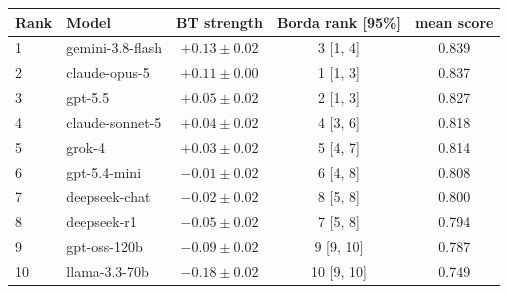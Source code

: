 \begin{tabular}{llccc}
\toprule
Rank & Model & BT strength & Borda rank [95\%] & mean score \\
\midrule
1 & gemini-3.8-flash & $+0.13 \pm 0.02$ & 3 [1, 4] & 0.839 \\
2 & claude-opus-5 & $+0.11 \pm 0.00$ & 1 [1, 3] & 0.837 \\
3 & gpt-5.5 & $+0.05 \pm 0.02$ & 2 [1, 3] & 0.827 \\
4 & claude-sonnet-5 & $+0.04 \pm 0.02$ & 4 [3, 6] & 0.818 \\
5 & grok-4 & $+0.03 \pm 0.02$ & 5 [4, 7] & 0.814 \\
6 & gpt-5.4-mini & $-0.01 \pm 0.02$ & 6 [4, 8] & 0.808 \\
7 & deepseek-chat & $-0.02 \pm 0.02$ & 8 [5, 8] & 0.800 \\
8 & deepseek-r1 & $-0.05 \pm 0.02$ & 7 [5, 8] & 0.794 \\
9 & gpt-oss-120b & $-0.09 \pm 0.02$ & 9 [9, 10] & 0.787 \\
10 & llama-3.3-70b & $-0.18 \pm 0.02$ & 10 [9, 10] & 0.749 \\
\bottomrule
\end{tabular}

